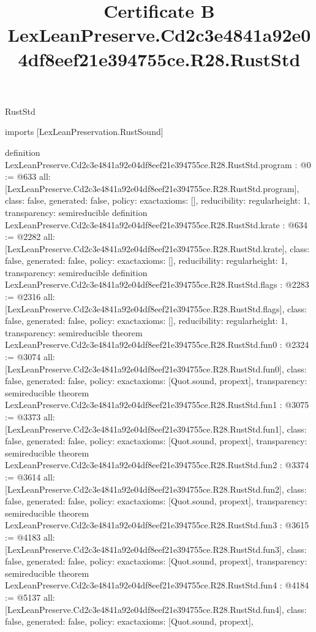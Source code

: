 \begin{lexlean}{RustStd}
\title{Certificate B LexLeanPreserve.Cd2c3e4841a92e04df8eef21e394755ce.R28.RustStd}
\begin{coremodule}
imports [LexLeanPreservation.RustSound]

definition LexLeanPreserve.Cd2c3e4841a92e04df8eef21e394755ce.R28.RustStd.program : @0 := @633 {
  all: [LexLeanPreserve.Cd2c3e4841a92e04df8eef21e394755ce.R28.RustStd.program],
  class: false,
  generated: false,
  policy: exact{axioms: []},
  reducibility: regular{height: 1},
  transparency: semireducible
}
definition LexLeanPreserve.Cd2c3e4841a92e04df8eef21e394755ce.R28.RustStd.krate : @634 := @2282 {
  all: [LexLeanPreserve.Cd2c3e4841a92e04df8eef21e394755ce.R28.RustStd.krate],
  class: false,
  generated: false,
  policy: exact{axioms: []},
  reducibility: regular{height: 1},
  transparency: semireducible
}
definition LexLeanPreserve.Cd2c3e4841a92e04df8eef21e394755ce.R28.RustStd.flags : @2283 := @2316 {
  all: [LexLeanPreserve.Cd2c3e4841a92e04df8eef21e394755ce.R28.RustStd.flags],
  class: false,
  generated: false,
  policy: exact{axioms: []},
  reducibility: regular{height: 1},
  transparency: semireducible
}
theorem LexLeanPreserve.Cd2c3e4841a92e04df8eef21e394755ce.R28.RustStd.fun0 : @2324 := @3074 {
  all: [LexLeanPreserve.Cd2c3e4841a92e04df8eef21e394755ce.R28.RustStd.fun0],
  class: false,
  generated: false,
  policy: exact{axioms: [Quot.sound, propext]},
  transparency: semireducible
}
theorem LexLeanPreserve.Cd2c3e4841a92e04df8eef21e394755ce.R28.RustStd.fun1 : @3075 := @3373 {
  all: [LexLeanPreserve.Cd2c3e4841a92e04df8eef21e394755ce.R28.RustStd.fun1],
  class: false,
  generated: false,
  policy: exact{axioms: [Quot.sound, propext]},
  transparency: semireducible
}
theorem LexLeanPreserve.Cd2c3e4841a92e04df8eef21e394755ce.R28.RustStd.fun2 : @3374 := @3614 {
  all: [LexLeanPreserve.Cd2c3e4841a92e04df8eef21e394755ce.R28.RustStd.fun2],
  class: false,
  generated: false,
  policy: exact{axioms: [Quot.sound, propext]},
  transparency: semireducible
}
theorem LexLeanPreserve.Cd2c3e4841a92e04df8eef21e394755ce.R28.RustStd.fun3 : @3615 := @4183 {
  all: [LexLeanPreserve.Cd2c3e4841a92e04df8eef21e394755ce.R28.RustStd.fun3],
  class: false,
  generated: false,
  policy: exact{axioms: [Quot.sound, propext]},
  transparency: semireducible
}
theorem LexLeanPreserve.Cd2c3e4841a92e04df8eef21e394755ce.R28.RustStd.fun4 : @4184 := @5137 {
  all: [LexLeanPreserve.Cd2c3e4841a92e04df8eef21e394755ce.R28.RustStd.fun4],
  class: false,
  generated: false,
  policy: exact{axioms: [Quot.sound, propext]},
}
\end{coremodule}
\end{lexlean}
